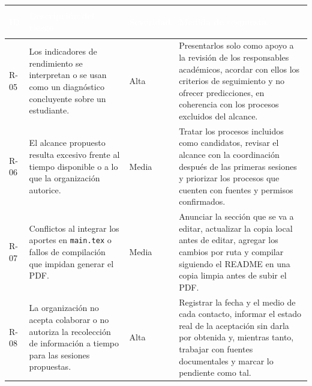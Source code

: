 \documentclass[11pt,a4paper]{article}
\begin{document}

\begin{tabularx}{\textwidth}{
    |>{\columncolor{azulclaro}\bfseries\raggedright\arraybackslash}p{1.4cm}
    |>{\raggedright\arraybackslash}X
    |>{\raggedright\arraybackslash}p{2.0cm}
    |>{\raggedright\arraybackslash}X|
}

\hline

\rowcolor{azul}
\textcolor{white}{\textbf{ID}} &
\textcolor{white}{\textbf{Descripción del riesgo}} &
\textcolor{white}{\textbf{Severidad}} &
\textcolor{white}{\textbf{Medida de respuesta}} \\

\hline

R-05 &
Los indicadores de rendimiento se interpretan o se usan como un diagnóstico concluyente sobre un estudiante. &
Alta &
Presentarlos solo como apoyo a la revisión de los responsables académicos, acordar con ellos los criterios de seguimiento y no ofrecer predicciones, en coherencia con los procesos excluidos del alcance. \\

\hline

R-06 &
El alcance propuesto resulta excesivo frente al tiempo disponible o a lo que la organización autorice. &
Media &
Tratar los procesos incluidos como candidatos, revisar el alcance con la coordinación después de las primeras sesiones y priorizar los procesos que cuenten con fuentes y permisos confirmados. \\

\hline

R-07 &
Conflictos al integrar los aportes en \texttt{main.tex} o fallos de compilación que impidan generar el PDF. &
Media &
Anunciar la sección que se va a editar, actualizar la copia local antes de editar, agregar los cambios por ruta y compilar siguiendo el README en una copia limpia antes de subir el PDF. \\

\hline

R-08 &
La organización no acepta colaborar o no autoriza la recolección de información a tiempo para las sesiones propuestas. &
Alta &
Registrar la fecha y el medio de cada contacto, informar el estado real de la aceptación sin darla por obtenida y, mientras tanto, trabajar con fuentes documentales y marcar lo pendiente como tal. \\

\hline

\end{tabularx}
\end{document}

